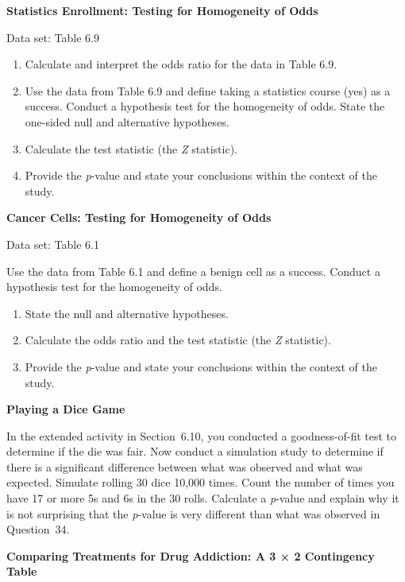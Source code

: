 \documentclass[
]{report}
\begin{document}
\begin{list}{E.}{ \setlength{\itemsep}{0.5em}}
  \item \textbf{Statistics Enrollment: Testing for Homogeneity of Odds}    

  Data set: Table 6.9    
  
  \begin{enumerate}
    \item Calculate and interpret the odds ratio for the data in Table 6.9.
    \item Use the data from Table 6.9 and define taking a statistics course (yes) as a success. Conduct a hypothesis test for the homogeneity of odds. State the one-sided null and alternative hypotheses.
    \item Calculate the test statistic (the \textit{Z} statistic).
    \item Provide the \textit{p}-value and state your conclusions within the context of the study.
  \end{enumerate}

  \item \textbf{Cancer Cells: Testing for Homogeneity of Odds}    

  Data set: Table 6.1    
  
  Use the data from Table 6.1 and define a benign cell as a success. Conduct a hypothesis test for the homogeneity of odds.  
  \begin{enumerate}
    \item State the null and alternative hypotheses.
    \item Calculate the odds ratio and the test statistic (the \textit{Z} statistic).
    \item Provide the \textit{p}-value and state your conclusions within the context of the study.
  \end{enumerate}

  \item \textbf{Playing a Dice Game}    

  In the extended activity in Section 6.10, you conducted a goodness-of-fit test to determine if the die was fair. Now conduct a simulation study to determine if there is a significant difference between what was observed and what was expected. Simulate rolling 30 dice 10,000 times. Count the number of times you have 17 or more 5s and 6s in the 30 rolls. Calculate a \textit{p}-value and explain why it is not surprising that the \textit{p}-value is very different than what was observed in Question 34.

  \item \textbf{Comparing Treatments for Drug Addiction: A 3 × 2 Contingency Table}    


\end{list}
\end{document}
